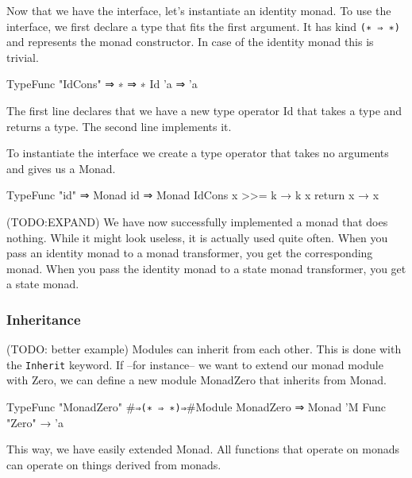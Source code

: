 \begin{multicols}{2}
  Now that we have the interface, let's instantiate an identity monad.
  To use the interface, we first declare a type that fits the first argument.
  It has kind \verb|(∗ ⇒ ∗)| and represents the monad constructor.
  In case of the identity monad this is trivial.

  \begin{code}
  TypeFunc "IdCons" ⇒ ∗ ⇒ ∗
  Id 'a ⇒ 'a
  \end{code}

  The first line declares that we have a new type operator Id that takes a type and returns a type.
  The second line implements it. 

  To instantiate the interface we create a type operator that takes no arguments and gives us a Monad.
  
  \begin{code}
  TypeFunc "id" ⇒ Monad 
  id ⇒ Monad IdCons {
    x >>= k → k x
    return x → x
  }
  \end{code}

  (TODO:EXPAND)
  We have now successfully implemented a monad that does nothing.
  While it might look useless, it is actually used quite often.
  When you pass an identity monad to a monad transformer, you get the corresponding monad.
  When you pass the identity monad to a state monad transformer, you get a state monad.
\end{multicols}
\pagebreak
\begin{multicols*}{2}
  \subsubsection*{Inheritance}
  (TODO: better example)
  Modules can inherit from each other.
  This is done with the \verb|Inherit| keyword. 
  If --for instance-- we want to extend our monad module with Zero,
  we can define a new module MonadZero that inherits from Monad.

  \begin{code}
  TypeFunc "MonadZero" #\verb|⇒(∗ ⇒ ∗)⇒|#Module
  MonadZero ⇒ Monad 'M {
    Func "Zero" → 'a
  }
  \end{code}

  This way, we have easily extended Monad.
  All functions that operate on monads can operate on things derived from monads.
\end{multicols*}
